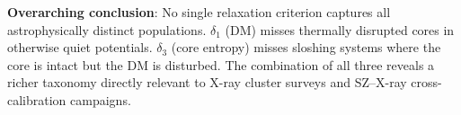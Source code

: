 \documentclass[12pt,a4paper]{article}
\begin{document}
\noindent \textbf{Overarching conclusion}: No single relaxation criterion captures all
astrophysically distinct populations. $\delta_1$ (DM) misses thermally disrupted
cores in otherwise quiet potentials. $\delta_3$ (core entropy) misses sloshing
systems where the core is intact but the DM is disturbed. The combination of all
three reveals a richer taxonomy directly relevant to X-ray cluster surveys and
SZ--X-ray cross-calibration campaigns.



\end{document}
